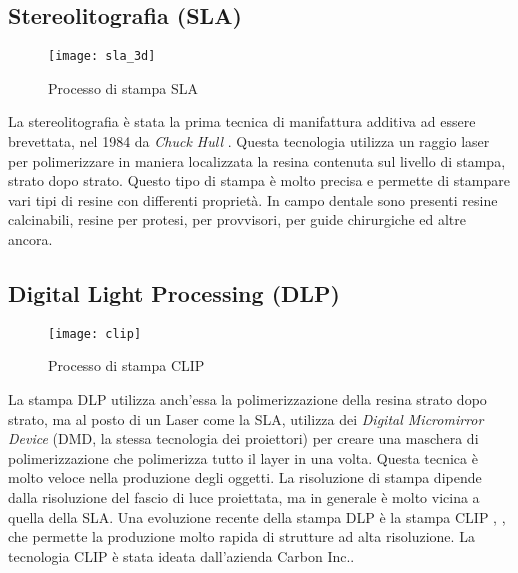 \subsection{Stereolitografia (SLA)}
\begin{wrapfigure} {R} {0.37\textwidth}
\vspace{-40pt}
	\begin{center}
	\texttt{[image: sla\_3d]}
    \caption{Processo di stampa SLA}
    \label{fig:sla_3d}
    \end{center}
\vspace{-40pt}
\end{wrapfigure}
La stereolitografia è stata la prima tecnica di manifattura additiva ad essere brevettata, nel 1984 da \emph{Chuck Hull} \parencite{Reference124}. Questa tecnologia utilizza un raggio laser per polimerizzare in maniera localizzata la resina contenuta sul livello di stampa, strato dopo strato. Questo tipo di stampa è molto precisa e permette di stampare vari tipi di resine con differenti proprietà. In campo dentale sono presenti resine calcinabili, resine per protesi, per provvisori, per guide chirurgiche ed altre ancora. 

\subsection{Digital Light Processing (DLP)}
\begin{wrapfigure} {R} {0.37\textwidth}
\vspace{-40pt}
	\begin{center}
	\texttt{[image: clip]}
    \caption{Processo di stampa CLIP}
    \label{fig:clip}
    \end{center}
\vspace{-20pt}
\end{wrapfigure}
La stampa DLP utilizza anch'essa la polimerizzazione della resina strato dopo strato, ma al posto di un Laser come la SLA, utilizza dei \emph{Digital Micromirror Device} (DMD, la stessa tecnologia dei proiettori) per creare una maschera di polimerizzazione che polimerizza tutto il layer in una volta. Questa tecnica è molto veloce nella produzione degli oggetti. La risoluzione di stampa dipende dalla risoluzione del fascio di luce proiettata, ma in generale è molto vicina a quella della SLA. Una evoluzione recente della stampa DLP è la stampa CLIP \parencite{Reference121}, \parencite{Reference122}, che permette la produzione molto rapida di strutture ad alta risoluzione. La tecnologia CLIP è stata ideata dall'azienda Carbon Inc.\parencite{Reference123}.

